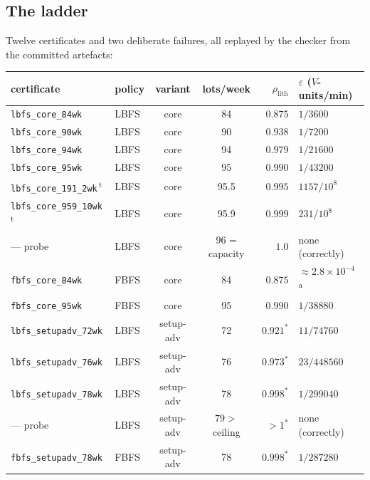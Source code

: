 \subsection{The ladder}

Twelve certificates and two deliberate failures, all replayed by the
checker from the committed artefacts:

\begin{center}\small
\begin{tabular}{@{}llccrl@{}}
\toprule
certificate & policy & variant & lots/week & $\rho_{\mathrm{lith}}$ &
$\varepsilon$ ($V$-units/min)\\
\midrule
\texttt{lbfs\_core\_84wk} & LBFS & core & 84 & $0.875$ & $1/3600$\\
\texttt{lbfs\_core\_90wk} & LBFS & core & 90 & $0.938$ & $1/7200$\\
\texttt{lbfs\_core\_94wk} & LBFS & core & 94 & $0.979$ & $1/21600$\\
\texttt{lbfs\_core\_95wk} & LBFS & core & 95 & $0.990$ & $1/43200$\\
\texttt{lbfs\_core\_191\_2wk}\,\textsuperscript{t} & LBFS & core &
  95.5 & $0.995$ & $1157/10^{8}$\\
\texttt{lbfs\_core\_959\_10wk}\,\textsuperscript{t} & LBFS & core &
  95.9 & $0.999$ & $231/10^{8}$\\
--- probe & LBFS & core & $96$ = capacity & $1.0$ & none (correctly)\\
\texttt{fbfs\_core\_84wk} & FBFS & core & 84 & $0.875$ &
  $\approx 2.8 \times 10^{-4}$\,\textsuperscript{a}\\
\texttt{fbfs\_core\_95wk} & FBFS & core & 95 & $0.990$ & $1/38880$\\
\texttt{lbfs\_setupadv\_72wk} & LBFS & setup-adv & 72 & $0.921^{*}$ &
  $11/74760$\\
\texttt{lbfs\_setupadv\_76wk} & LBFS & setup-adv & 76 & $0.973^{*}$ &
  $23/448560$\\
\texttt{lbfs\_setupadv\_78wk} & LBFS & setup-adv & 78 & $0.998^{*}$ &
  $1/299040$\\
--- probe & LBFS & setup-adv & $79 >$ ceiling & $>1^{*}$ & none (correctly)\\
\texttt{fbfs\_setupadv\_78wk} & FBFS & setup-adv & 78 & $0.998^{*}$ &
  $1/287280$\\
\bottomrule
\end{tabular}
\end{center}

 \medskip

